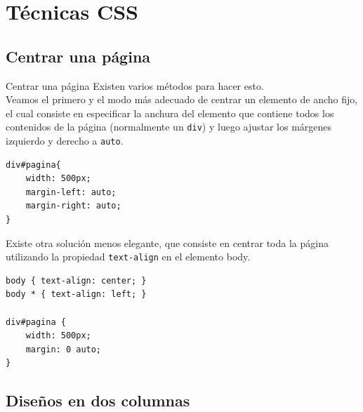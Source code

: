 
\section{Técnicas CSS}

\subsection{Centrar una página} %

\begin{frame}[fragile]{Centrar una página} %
    Existen varios métodos para hacer esto. \\
    Veamos el primero y el modo más adecuado de centrar un elemento de ancho
    fijo, el cual consiste en especificar la anchura del elemento que contiene
    todos los contenidos de la página (normalmente un \texttt{div}) y luego
    ajustar los márgenes izquierdo y derecho a \texttt{auto}. 

    \begin{lstlisting}
div#pagina{
    width: 500px;
    margin-left: auto;
    margin-right: auto;
}
    \end{lstlisting}

    Existe otra solución menos elegante, que consiste en centrar toda la página
    utilizando la propiedad \texttt{text-align} en el elemento body.

    \begin{lstlisting}
body { text-align: center; } 
body * { text-align: left; }

div#pagina {
    width: 500px;
    margin: 0 auto;
}
    \end{lstlisting}
\end{frame}


\subsection{Diseños en dos columnas} %

